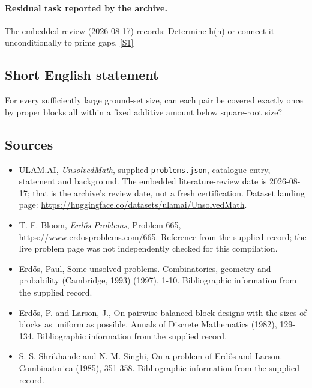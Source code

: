 \documentclass[11pt,a4paper]{article}
\newcommand{\sref}[2]{\hyperlink{source:#1:#2}{[S#2]}}
\begin{document}
\paragraph{Residual task reported by the archive.}

The embedded review (2026-08-17) records: Determine h(n) or connect it unconditionally to prime gaps. \sref{statement}{1}

\subsection{Short English statement}

For every sufficiently large ground-set size, can each pair be covered exactly once by proper blocks all within a fixed additive amount below square-root size?

\subsection{Sources}

{\small

\begin{itemize}

\item[\hypertarget{source:statement:1}{S1}] ULAM.AI, \emph{UnsolvedMath}, supplied \texttt{problems.json}, catalogue entry, statement and background. The embedded literature-review date is 2026-08-17; that is the archive’s review date, not a fresh certification. Dataset landing page: \url{https://huggingface.co/datasets/ulamai/UnsolvedMath}.

\item[\hypertarget{source:statement:2}{S2}] T. F. Bloom, \emph{Erdős Problems}, Problem 665, \url{https://www.erdosproblems.com/665}. Reference from the supplied record; the live problem page was not independently checked for this compilation.

\item[\hypertarget{source:statement:3}{S3}] Erd\H{o}s, Paul, Some unsolved problems. Combinatorics, geometry and probability (Cambridge, 1993) (1997), 1-10. Bibliographic information from the supplied record.

\item[\hypertarget{source:statement:4}{S4}] Erd\H{o}s, P. and Larson, J., On pairwise balanced block designs with the sizes of blocks as uniform as possible. Annals of Discrete Mathematics (1982), 129-134. Bibliographic information from the supplied record.

\item[\hypertarget{source:statement:5}{S5}] S. S. Shrikhande and N. M. Singhi, On a problem of Erd\H{o}s and Larson. Combinatorica (1985), 351-358. Bibliographic information from the supplied record.

\end{itemize}

}

\label{end:statement}
\end{document}
